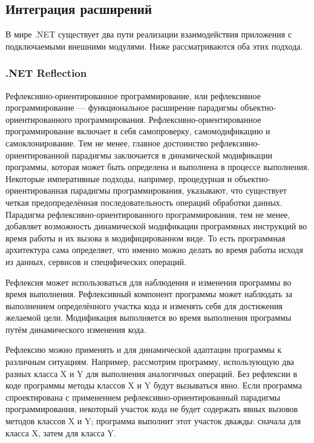 \subsection{Интеграция расширений}
\label{sec:extention_interaction}

В мире .NET существует два пути реализации взаимодействия приложения с подключаемыми внешними модулями. Ниже рассматриваются оба этих подхода.

\subsubsection{.NET Reflection}

Рефлексивно-ориентированное программирование, или рефлексивное программирование — функциональное расширение парадигмы объектно-ориентированного программирования. Рефлексивно-ориентированное программирование включает в себя самопроверку, самомодификацию и самоклонирование. Тем не менее, главное достоинство рефлексивно-ориентированной парадигмы заключается в динамической модификации программы, которая может быть определена и выполнена в процессе выполнения. Некоторые императивные подходы, например, процедурная и объектно-ориентированная парадигмы программирования, указывают, что существует четкая предопределённая последовательность операций обработки данных. Парадигма рефлексивно-ориентированного программирования, тем не менее, добавляет возможность динамической модификации программных инструкций во время работы и их вызова в модифицированном виде. То есть программная архитектура сама определяет, что именно можно делать во время работы исходя из данных, сервисов и специфических операций.

Рефлексия может использоваться для наблюдения и изменения программы во время выполнения. Рефлексивный компонент программы может наблюдать за выполнением определённого участка кода и изменять себя для достижения желаемой цели. Модификация выполняется во время выполнения программы путём динамического изменения кода.

Рефлексию можно применять и для динамической адаптации программы к различным ситуациям. Например, рассмотрим программу, использующую два разных класса X и Y для выполнения аналогичных операций. Без рефлексии в коде программы методы классов X и Y будут вызываться явно. Если программа спроектирована с применением рефлексивно-ориентированный парадигмы программирования, некоторый участок кода не будет содержать явных вызовов методов классов X и Y; программа выполнит этот участок дважды: сначала для класса X, затем для класса Y.

